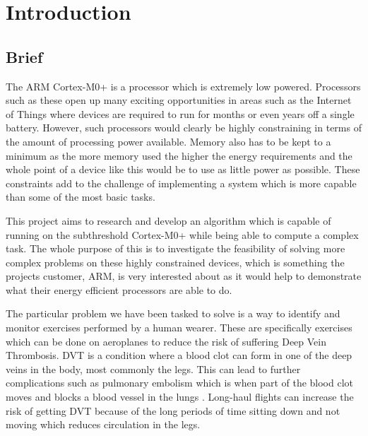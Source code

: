 \chapter{Introduction}

\section{Brief}
The ARM Cortex-M0+ is a processor which is extremely low powered. Processors such as these open up many exciting opportunities in areas such as the Internet of Things where devices are required to run for months or even years off a single battery. However, such processors would clearly be highly constraining in terms of the amount of processing power available. Memory also has to be kept to a minimum as the more memory used the higher the energy requirements and the whole point of a device like this would be to use as little power as possible. These constraints add to the challenge of implementing a system which is more capable than some of the most basic tasks.

This project aims to research and develop an algorithm which is capable of running on the subthreshold Cortex-M0+ while being able to compute a complex task. The whole purpose of this is to investigate the feasibility of solving more complex problems on these highly constrained devices, which is something the projects customer, ARM, is very interested about as it would help to demonstrate what their energy efficient processors are able to do.

The particular problem we have been tasked to solve is a way to identify and monitor exercises performed by a human wearer. These are specifically exercises which can be done on aeroplanes to reduce the risk of suffering Deep Vein Thrombosis. DVT is a condition where a blood clot can form in one of the deep veins in the body, most commonly the legs. This can lead to further complications such as pulmonary embolism which is when part of the blood clot moves and blocks a blood vessel in the lungs \cite{NHS2014DVT}. Long-haul flights can increase the risk of getting DVT because of the long periods of time sitting down and not moving which reduces circulation in the legs.

